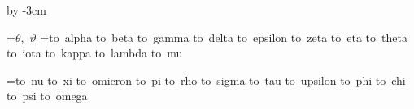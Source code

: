 \advance\hsize by -3cm

\begingroup
\medium
\obeylines
{}=\hbox{$\displaystyle \theta$, $\vartheta$\quad}
=\vbox{\hbox{\hbox to  alpha}
\hbox{\hbox to  beta}
\hbox{\hbox to  gamma}
\hbox{\hbox to  delta}
\hbox{\hbox to  epsilon}
\hbox{\hbox to  zeta}
\hbox{\hbox to  eta}
\hbox{\hbox to  theta}
\hbox{\hbox to  iota}
\hbox{\hbox to  kappa}
\hbox{\hbox to  lambda}
\hbox{\hbox to  mu}}

=\vbox{\hbox{\hbox to  nu}
\hbox{\hbox to  xi}
\hbox{\hbox to  omicron}
\hbox{\hbox to  pi}
\hbox{\hbox to  rho}
\hbox{\hbox to  sigma}
\hbox{\hbox to  tau}
\hbox{\hbox to  upsilon}
\hbox{\hbox to  phi}
\hbox{\hbox to  chi}
\hbox{\hbox to  psi}
\hbox{\hbox to  omega}}

